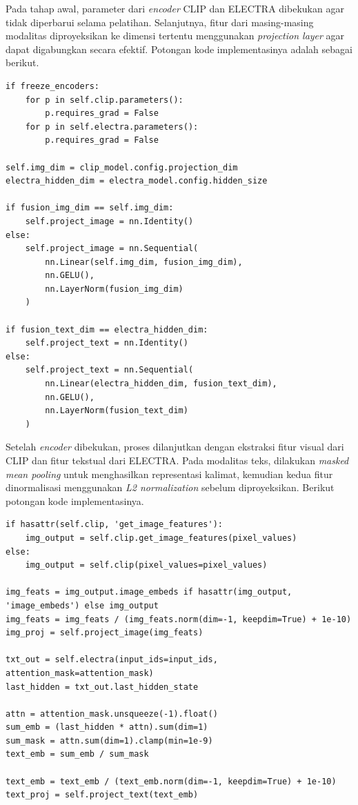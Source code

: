 Pada tahap awal, parameter dari \textit{encoder} CLIP dan ELECTRA dibekukan agar tidak diperbarui selama pelatihan. Selanjutnya, fitur dari masing-masing modalitas diproyeksikan ke dimensi tertentu menggunakan \textit{projection layer} agar dapat digabungkan secara efektif. Potongan kode implementasinya adalah sebagai berikut.

\begin{lstlisting}[caption={Kode pembekuan encoder dan projection layer pada model multimodal}, label={code:4.multimodal_projection}]
if freeze_encoders:
    for p in self.clip.parameters():
        p.requires_grad = False
    for p in self.electra.parameters():
        p.requires_grad = False

self.img_dim = clip_model.config.projection_dim
electra_hidden_dim = electra_model.config.hidden_size

if fusion_img_dim == self.img_dim:
    self.project_image = nn.Identity()
else:
    self.project_image = nn.Sequential(
        nn.Linear(self.img_dim, fusion_img_dim),
        nn.GELU(),
        nn.LayerNorm(fusion_img_dim)
    )

if fusion_text_dim == electra_hidden_dim:
    self.project_text = nn.Identity()
else:
    self.project_text = nn.Sequential(
        nn.Linear(electra_hidden_dim, fusion_text_dim),
        nn.GELU(),
        nn.LayerNorm(fusion_text_dim)
    )
\end{lstlisting}

Setelah \textit{encoder} dibekukan, proses dilanjutkan dengan ekstraksi fitur visual dari CLIP dan fitur tekstual dari ELECTRA. Pada modalitas teks, dilakukan \textit{masked mean pooling} untuk menghasilkan representasi kalimat, kemudian kedua fitur dinormalisasi menggunakan \textit{L2 normalization} sebelum diproyeksikan. Berikut potongan kode implementasinya.

\begin{lstlisting}[caption={Kode ekstraksi fitur pada model multimodal}, label={code:4.multimodal_features}]
if hasattr(self.clip, 'get_image_features'):
    img_output = self.clip.get_image_features(pixel_values)
else:
    img_output = self.clip(pixel_values=pixel_values)

img_feats = img_output.image_embeds if hasattr(img_output, 'image_embeds') else img_output
img_feats = img_feats / (img_feats.norm(dim=-1, keepdim=True) + 1e-10)
img_proj = self.project_image(img_feats)

txt_out = self.electra(input_ids=input_ids, attention_mask=attention_mask)
last_hidden = txt_out.last_hidden_state

attn = attention_mask.unsqueeze(-1).float()
sum_emb = (last_hidden * attn).sum(dim=1)
sum_mask = attn.sum(dim=1).clamp(min=1e-9)
text_emb = sum_emb / sum_mask

text_emb = text_emb / (text_emb.norm(dim=-1, keepdim=True) + 1e-10)
text_proj = self.project_text(text_emb)
\end{lstlisting}

